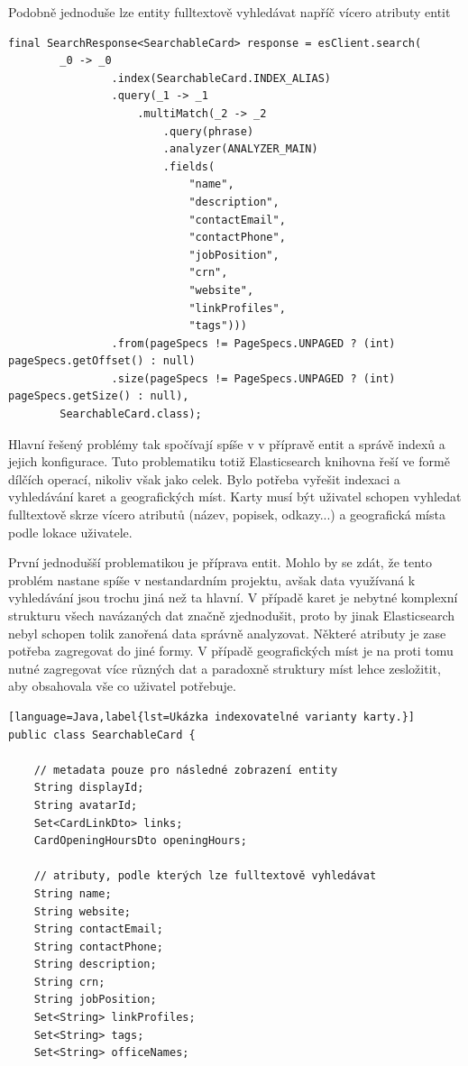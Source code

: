 \begin{itemize}
\begin{itemize}
		Podobně jednoduše lze entity fulltextově vyhledávat napříč vícero atributy entit
		\begin{lstlisting}[langauge=Java,label={lst:Ukázka fulltextového vyhledání indexovaných karet pomocí několika atributů.}]
final SearchResponse<SearchableCard> response = esClient.search(
		_0 -> _0
				.index(SearchableCard.INDEX_ALIAS)
				.query(_1 -> _1
					.multiMatch(_2 -> _2
						.query(phrase)
						.analyzer(ANALYZER_MAIN)
						.fields(
							"name",
							"description",
							"contactEmail",
							"contactPhone",
							"jobPosition",
							"crn",
							"website",
							"linkProfiles",
							"tags")))
				.from(pageSpecs != PageSpecs.UNPAGED ? (int) pageSpecs.getOffset() : null)
				.size(pageSpecs != PageSpecs.UNPAGED ? (int) pageSpecs.getSize() : null),
		SearchableCard.class);
		\end{lstlisting}

		Hlavní řešený problémy tak spočívají spíše v v přípravě entit a správě indexů a jejich konfigurace.
		Tuto problematiku totiž Elasticsearch knihovna řeší ve formě dílčích operací, nikoliv však jako celek.
		Bylo potřeba vyřešit indexaci a vyhledávání karet a geografických míst.
		Karty musí být uživatel schopen vyhledat fulltextově skrze vícero atributů (název, popisek, odkazy...) a geografická
		místa podle lokace uživatele.

		První jednodušší problematikou je příprava entit.
		Mohlo by se zdát, že tento problém nastane spíše v nestandardním projektu, avšak data využívaná k vyhledávání
		jsou trochu jiná než ta hlavní.
		V případě karet je nebytné komplexní strukturu všech navázaných dat značně zjednodušit, proto by jinak Elasticsearch
		nebyl schopen tolik zanořená data správně analyzovat.
		Některé atributy je zase potřeba zagregovat do jiné formy.
		V případě geografických míst je na proti tomu nutné zagregovat více různých dat a paradoxně struktury míst lehce
		zesložitit, aby obsahovala vše co uživatel potřebuje.

		\begin{lstlisting}[language=Java,label{lst=Ukázka indexovatelné varianty karty.}]
public class SearchableCard {

	// metadata pouze pro následné zobrazení entity
    String displayId;
    String avatarId;
    Set<CardLinkDto> links;
    CardOpeningHoursDto openingHours;

	// atributy, podle kterých lze fulltextově vyhledávat
    String name;
    String website;
    String contactEmail;
    String contactPhone;
    String description;
    String crn;
    String jobPosition;
    Set<String> linkProfiles;
    Set<String> tags;
    Set<String> officeNames;


\end{lstlisting}
\end{itemize}
\end{itemize}
